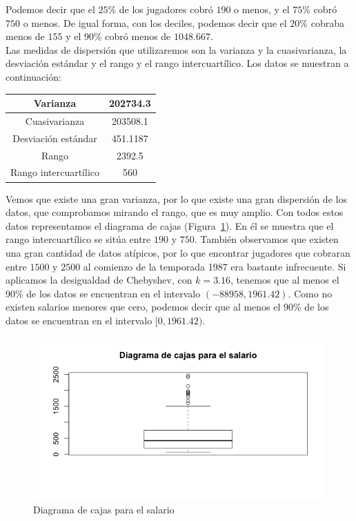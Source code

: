 \documentclass[12pt,a4paper,twoside,openright,titlepage,final]{article}
\begin{document}
Podemos decir que el $25\%$ de los jugadores cobró $190$ o menos, y el $75\%$ cobró $750$ o menos. De igual forma, con los deciles, podemos decir que el $20\%$ cobraba menos de $155$ y el $90\%$ cobró menos de $1048.667$.\\

Las medidas de dispersión que utilizaremos son la varianza y la cuasivarianza, la desviación estándar y el rango y el rango intercuartílico. Los datos se muestran a continuación:

\begin{table}[htbp]
\centering
\begin{tabular}{|c|c|}
\hline Varianza & 202734.3 \\ 
\hline Cuasivarianza & 203508.1 \\
\hline Desviación estándar & 451.1187 \\  
\hline Rango & 2392.5  \\ 
\hline Rango intercuartílico & 560  \\ 
\hline 
\end{tabular} 
\end{table}

Vemos que existe una gran varianza, por lo que existe una gran dispersión de los datos, que comprobamos mirando el rango, que es muy amplio. Con todos estos datos representamos el diagrama de cajas (Figura~\ref{fig:diagrama_cajas_salario}). En él se muestra que el rango intercuartílico se sitúa entre $190$ y $750$. También observamos que existen una gran cantidad de datos atípicos, por lo que encontrar jugadores que cobraran entre $1500$ y $2500$ al comienzo de la temporada 1987 era bastante infrecuente. Si aplicamos la desigualdad de Chebyshev, con $k = 3.16$, tenemos que al menos el 90\% de los datos se encuentran en el intervalo $(-88958, 1961.42)$. Como no existen salarios menores que cero, podemos decir que al menos el 90\% de los datos se encuentran en el intervalo $[0, 1961.42)$.\\

\begin{figure}[tbph!]
\centering
\includegraphics[width=0.8\linewidth]{imagenes/diagrama_cajas_salario}
\caption{Diagrama de cajas para el salario}
\label{fig:diagrama_cajas_salario}
\end{figure}
\end{document}
